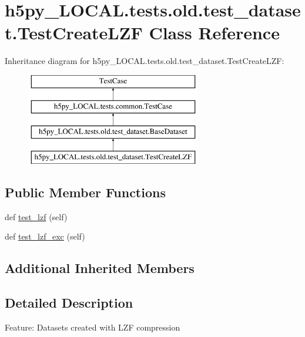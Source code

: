 \hypertarget{classh5py__LOCAL_1_1tests_1_1old_1_1test__dataset_1_1TestCreateLZF}{}\section{h5py\+\_\+\+L\+O\+C\+A\+L.\+tests.\+old.\+test\+\_\+dataset.\+Test\+Create\+L\+ZF Class Reference}
\label{classh5py__LOCAL_1_1tests_1_1old_1_1test__dataset_1_1TestCreateLZF}
Inheritance diagram for h5py\+\_\+\+L\+O\+C\+A\+L.\+tests.\+old.\+test\+\_\+dataset.\+Test\+Create\+L\+ZF\+:\begin{figure}[H]
\begin{center}
\leavevmode
\includegraphics[height=4.000000cm]{classh5py__LOCAL_1_1tests_1_1old_1_1test__dataset_1_1TestCreateLZF}
\end{center}
\end{figure}
\subsection*{Public Member Functions}
\begin{DoxyCompactItemize}
\item 
def \hyperlink{classh5py__LOCAL_1_1tests_1_1old_1_1test__dataset_1_1TestCreateLZF_aabee743ebb718f45eca0fef30b65ad4f}{test\+\_\+lzf} (self)
\item 
def \hyperlink{classh5py__LOCAL_1_1tests_1_1old_1_1test__dataset_1_1TestCreateLZF_a853a87fe1f6ac5edea80707f31cb7c7c}{test\+\_\+lzf\+\_\+exc} (self)
\end{DoxyCompactItemize}
\subsection*{Additional Inherited Members}


\subsection{Detailed Description}
\begin{DoxyVerb}    Feature: Datasets created with LZF compression
\end{DoxyVerb}
 

